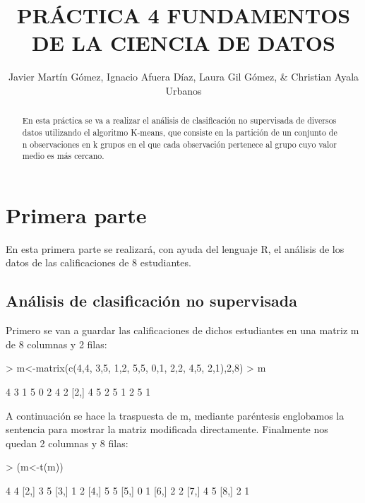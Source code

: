 \documentclass [a4paper] {article}
\title{PRÁCTICA 4 FUNDAMENTOS DE LA CIENCIA DE DATOS}
\author{Javier Martín Gómez, Ignacio Afuera Díaz, Laura Gil Gómez, & Christian Ayala Urbanos}
\begin{document}
\maketitle

\begin{abstract}
En esta práctica se va a realizar el análisis de clasificación no supervisada de diversos datos utilizando el algoritmo K-means, que consiste en la partición de un conjunto de n observaciones en k grupos en el que cada observación pertenece al grupo cuyo valor medio es más cercano.

\end{abstract}

\newpage
\tableofcontents
\newpage


\section{Primera parte}

En esta primera parte se realizará, con ayuda del lenguaje R, el análisis de los datos de las calificaciones de 8 estudiantes.

\subsection{Análisis de clasificación no supervisada}

Primero se van a guardar las calificaciones de dichos estudiantes en una matriz m de 8 columnas y 2 filas:

\begin{Schunk}
\begin{Sinput}
> m<-matrix(c(4,4, 3,5, 1,2, 5,5, 0,1, 2,2, 4,5, 2,1),2,8)
> m
\end{Sinput}
\begin{Soutput}
     [,1] [,2] [,3] [,4] [,5] [,6] [,7] [,8]
[1,]    4    3    1    5    0    2    4    2
[2,]    4    5    2    5    1    2    5    1
\end{Soutput}
\end{Schunk}

A continuación se hace la traspuesta de m, mediante paréntesis englobamos la sentencia para mostrar la matriz modificada directamente.
Finalmente nos quedan 2 columnas y 8 filas:

\begin{Schunk}
\begin{Sinput}
> (m<-t(m))
\end{Sinput}
\begin{Soutput}
     [,1] [,2]
[1,]    4    4
[2,]    3    5
[3,]    1    2
[4,]    5    5
[5,]    0    1
[6,]    2    2
[7,]    4    5
[8,]    2    1
\end{Soutput}
\end{Schunk}
\end{document}
